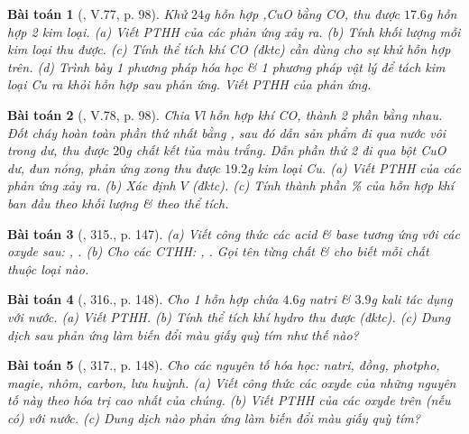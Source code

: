\documentclass{article}
\newtheorem{baitoan}{Bài toán}
\begin{document}
\begin{baitoan}[\cite{Truong_BTNC_Hoa_Hoc_8_2022}, V.77, p. 98]
	Khử $24$\emph{g} hỗn hợp \emph{,CuO} bằng \emph{CO}, thu được $17.6$\emph{g} hỗn hợp 2 kim loại. (a) Viết PTHH của các phản ứng xảy ra. (b) Tính khối lượng mỗi kim loại thu được. (c) Tính thể tích khí \emph{CO} (đktc) cần dùng cho sự khử hỗn hợp trên. (d) Trình bày 1 phương pháp hóa học \& 1 phương pháp vật lý để tách kim loại \emph{Cu} ra khỏi hỗn hợp sau phản ứng. Viết PTHH của phản ứng.
\end{baitoan}

\begin{baitoan}[\cite{Truong_BTNC_Hoa_Hoc_8_2022}, V.78, p. 98]
	Chia $V$\emph{l} hỗn hợp khí \emph{CO,} thành 2 phần bằng nhau. Đốt cháy hoàn toàn phần thứ nhất bằng \emph{}, sau đó dẫn sản phẩm đi qua nước vôi trong dư, thu được $20$\emph{g} chất kết tủa màu trắng. Dẫn phần thứ 2 đi qua bột \emph{CuO} dư, đun nóng, phản ứng xong thu được $19.2$\emph{g} kim loại \emph{Cu}. (a) Viết PTHH của các phản ứng xảy ra. (b) Xác định $V$ (đktc). (c) Tính thành phần \% của hỗn hợp khí ban đầu theo khối lượng \& theo thể tích. 
\end{baitoan}

\begin{baitoan}[\cite{An_400_BT_Hoa_Hoc_8_2020}, 315., p. 147]
	(a) Viết công thức các acid \& base tương ứng với các oxyde sau: \emph{, }. (b) Cho các CTHH: \emph{, }. Gọi tên từng chất \& cho biết mỗi chất thuộc loại nào.
\end{baitoan}

\begin{baitoan}[\cite{An_400_BT_Hoa_Hoc_8_2020}, 316., p. 148]
	Cho 1 hỗn hợp chứa $4.6$\emph{g} natri \& $3.9$\emph{g} kali tác dụng với nước. (a) Viết PTHH. (b) Tính thể tích khí hydro thu được (đktc). (c) Dung dịch sau phản ứng làm biến đổi màu giấy quỳ tím như thế nào?
\end{baitoan}

\begin{baitoan}[\cite{An_400_BT_Hoa_Hoc_8_2020}, 317., p. 148]
	Cho các nguyên tố hóa học: natri, đồng, photpho, magie, nhôm, carbon, lưu huỳnh. (a) Viết công thức các oxyde của những nguyên tố này theo hóa trị cao nhất của chúng. (b) Viết PTHH của các oxyde trên (nếu có) với nước. (c) Dung dịch nào phản ứng làm biến đổi màu giấy quỳ tím?
\end{baitoan}
\end{document}
